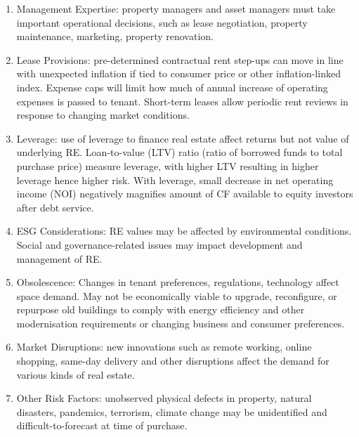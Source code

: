 \begin{remark} 
\begin{enumerate}[label=\roman*.]
\setlength{\itemsep}{0pt}
\item Management Expertise: property managers and asset managers must take important operational decisions, such as lease negotiation, property maintenance, marketing, property renovation.
\item Lease Provisions: pre-determined contractual rent step-ups can move in line with unexpected inflation if tied to consumer price or other inflation-linked index. Expense caps will limit how much of annual increase of operating expenses is passed to tenant. Short-term leases allow periodic rent reviews in response to changing market conditions.
\item Leverage: use of leverage to finance real estate affect returns but not value of underlying RE. Loan-to-value (LTV) ratio (ratio of borrowed funds to total purchase price) measure leverage, with higher LTV resulting in higher leverage hence higher risk. With leverage, small decrease in net operating income (NOI) negatively magnifies amount of CF available to equity investors after debt service.
\item ESG Considerations: RE values may be affected by environmental conditions. Social and governance-related issues may impact development and management of RE.
\item Obsolescence: Changes in tenant preferences, regulations, technology affect space demand. May not be economically viable to upgrade, reconfigure, or repurpose old buildings to comply with energy efficiency and other modernisation requirements or changing business and consumer preferences.
\item Market Disruptions: new innovations such as remote working, online shopping, same-day delivery and other disruptions affect the demand for various kinds of real estate.
\item Other Risk Factors: unobserved physical defects in property, natural disasters, pandemics, terrorism, climate change may be unidentified and difficult-to-forecast at time of purchase.
\end{enumerate}
\end{remark}

